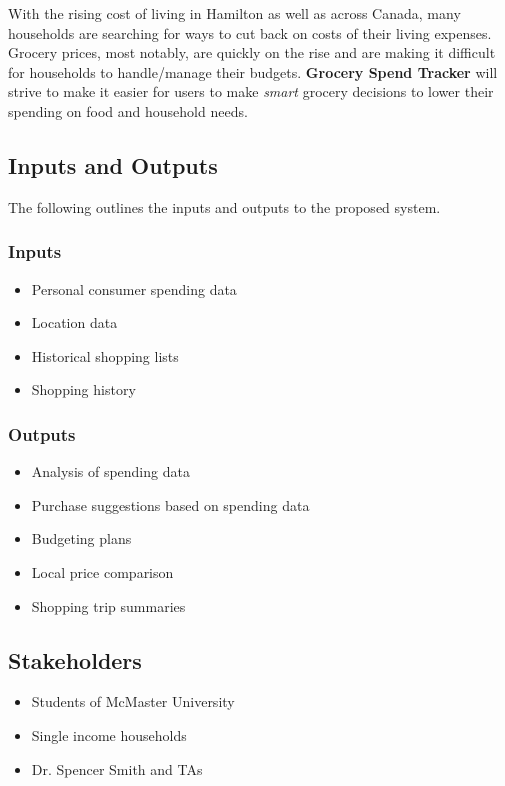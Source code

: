 \documentclass{article}
\begin{document}
With the rising cost of living in Hamilton as well as across Canada, many households are searching for ways to cut back on costs of their living expenses. Grocery prices, most notably, are quickly on the rise and are making it difficult for households to handle/manage their budgets. \textbf{Grocery Spend Tracker} will strive to make it easier for users to make \textit{smart} grocery decisions to lower their spending on food and household needs.

\subsection{Inputs and Outputs}
The following outlines the inputs and outputs to the proposed system.
\subsubsection{Inputs}
    \begin{itemize}
        \item Personal consumer spending data
        \item Location data
        \item Historical shopping lists
        \item Shopping history
    \end{itemize}

\subsubsection{Outputs}
    \begin{itemize}
        \item Analysis of spending data
        \item Purchase suggestions based on spending data
        \item Budgeting plans
        \item Local price comparison
        \item Shopping trip summaries
    \end{itemize}

\subsection{Stakeholders}

\begin{itemize}
    \item Students of McMaster University
    \item Single income households
    \item Dr. Spencer Smith and TAs
\end{itemize}
\end{document}
